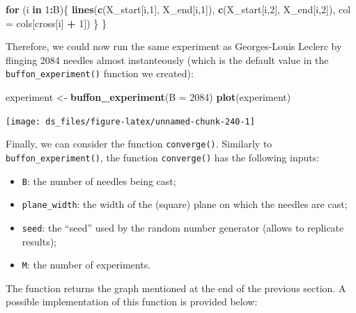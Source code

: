 \documentclass[12pt,]{krantz}
\newenvironment{Shaded}{\begin{snugshade}}{\end{snugshade}}
\newcommand{\KeywordTok}[1]{\textcolor[rgb]{0.27,0.27,0.27}{\textbf{#1}}}
\newcommand{\DataTypeTok}[1]{\textcolor[rgb]{0.27,0.27,0.27}{#1}}
\newcommand{\DecValTok}[1]{\textcolor[rgb]{0.06,0.06,0.06}{#1}}
\newcommand{\StringTok}[1]{\textcolor[rgb]{0.5,0.5,0.5}{#1}}
\newcommand{\ControlFlowTok}[1]{\textcolor[rgb]{0.27,0.27,0.27}{\textbf{#1}}}
\newcommand{\OperatorTok}[1]{\textcolor[rgb]{0.43,0.43,0.43}{\textbf{#1}}}
\newcommand{\NormalTok}[1]{#1}
\providecommand{\tightlist}{%
  \setlength{\itemsep}{0pt}\setlength{\parskip}{0pt}}
\begin{document}
\begin{Shaded}
\begin{Highlighting}[]
  \ControlFlowTok{for}\NormalTok{ (i }\ControlFlowTok{in} \DecValTok{1}\OperatorTok{:}\NormalTok{B)\{}
    \KeywordTok{lines}\NormalTok{(}\KeywordTok{c}\NormalTok{(X_start[i,}\DecValTok{1}\NormalTok{], X_end[i,}\DecValTok{1}\NormalTok{]), }\KeywordTok{c}\NormalTok{(X_start[i,}\DecValTok{2}\NormalTok{], X_end[i,}\DecValTok{2}\NormalTok{]), }
          \DataTypeTok{col =}\NormalTok{ cols[cross[i] }\OperatorTok{+}\StringTok{ }\DecValTok{1}\NormalTok{])}
\NormalTok{  \}}
\NormalTok{\}}
\end{Highlighting}
\end{Shaded}

Therefore, we could now run the same experiment as Georges-Louis Leclerc
by flinging 2084 needles almost instanteously (which is the default
value in the \texttt{buffon\_experiment()} function we created):

\begin{Shaded}
\begin{Highlighting}[]
\NormalTok{experiment <-}\StringTok{ }\KeywordTok{buffon_experiment}\NormalTok{(}\DataTypeTok{B =} \DecValTok{2084}\NormalTok{)}
\KeywordTok{plot}\NormalTok{(experiment)}
\end{Highlighting}
\end{Shaded}

\begin{center}\texttt{[image: ds\_files/figure-latex/unnamed-chunk-240-1]} \end{center}

Finally, we can consider the function \texttt{converge()}. Similarly to
\texttt{buffon\_experiment()}, the function \texttt{converge()} has the
following inputs:

\begin{itemize}
\tightlist
\item
  \texttt{B}: the number of needles being cast;
\item
  \texttt{plane\_width}: the width of the (square) plane on which the
  needles are cast;
\item
  \texttt{seed}: the ``seed'' used by the random number generator
  (allows to replicate results);
\item
  \texttt{M}: the number of experiments.
\end{itemize}

The function returns the graph mentioned at the end of the previous
section. A possible implementation of this function is provided below:
\end{document}
